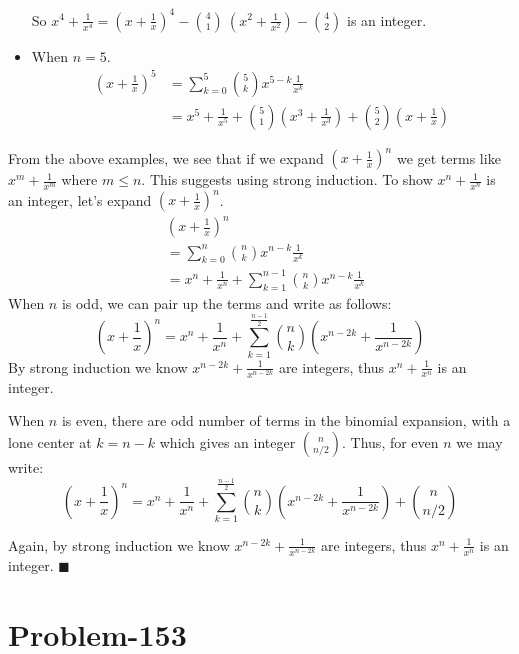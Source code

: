 \documentclass[12pt]{article}
\begin{document}
\begin{itemize}
So $x^4 + \frac{1}{x^4} = \left(x + \frac{1}{x}\right)^4 - \binom{4}{1}\ \left( x^2 + \frac{1}{x^2} \right)- \binom{4}{2}$ is an integer.

\item When $n=5$.
\begin{equation*}
	\begin{aligned}
		\left( x + \frac{1}{x} \right)^5 &= \sum_{k=0}^5 \binom{5}{k} x^{5-k} \frac{1}{x^k}\\
		&= x^5 + \frac{1}{x^5} + \binom{5}{1}\left( x^3 + \frac{1}{x^3} \right) + \binom{5}{2} \left( x + \frac{1}{x} \right)
	\end{aligned}
\end{equation*}
\end{itemize}
From the above examples, we see that if we expand $\left(x + \frac{1}{x}\right)^n$ we get terms like $x^m + \frac{1}{x^m}$ where $m \leq n$. This suggests using strong induction. To show $x^n + \frac{1}{x^n}$ is an integer, let's expand $\left(x+\frac{1}{x}\right)^n$.
\begin{equation*}
	\begin{aligned}
		& \left(x+\frac{1}{x}\right)^n\\
		&= \sum_{k=0}^n \binom{n}{k} x^{n-k} \frac{1}{x^{k}}\\
		&= x^n + \frac{1}{x^n} + \sum_{k=1}^{n-1}\binom{n}{k}x^{n-k}\frac{1}{x^k}
	\end{aligned}
\end{equation*}
When $n$ is odd, we can pair up the terms and write as follows:
\[
	\left(x+\frac{1}{x}\right)^n = x^n + \frac{1}{x^n} + \sum_{k=1}^{\frac{n-1}{2}}\binom{n}{k}\left( x^{n-2k} + \frac{1}{x^{n-2k}} \right)
\]
By strong induction we know $x^{n-2k} + \frac{1}{x^{n-2k}}$ are integers, thus $x^n + \frac{1}{x^n}$ is an integer.

When $n$ is even, there are odd number of terms in the binomial expansion, with a lone center at $k = n-k$ which gives an integer $\binom{n}{n/2}$. Thus, for even $n$ we may write:
\[
	\left(x+\frac{1}{x}\right)^n = x^n + \frac{1}{x^n} + \sum_{k=1}^{\frac{n-1}{2}}\binom{n}{k}\left( x^{n-2k} + \frac{1}{x^{n-2k}} \right) + \binom{n}{n/2}
\]

Again, by strong induction we know $x^{n-2k} + \frac{1}{x^{n-2k}}$ are integers, thus $x^n + \frac{1}{x^n}$ is an integer.  $\blacksquare$

\section*{Problem-153}
\end{document}
